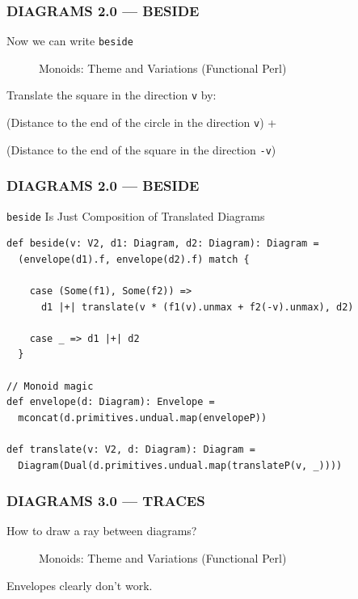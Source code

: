 \documentclass{beamer}
\begin{document}
\begin{frame} \frametitle{DIAGRAMS 2.0 --- BESIDE}
Now we can write \texttt{beside}
  \begin{figure}
      \centering
      \caption{Monoids: Theme and Variations (Functional Perl)}
  \end{figure}
  \vspace{-.5cm}
  Translate the square in the direction \texttt{v} by:

  (Distance to the end of the circle in the direction \texttt{v}) +

  (Distance to the end of the square in the direction \texttt{-v})
\end{frame}

\begin{frame}[fragile] \frametitle{DIAGRAMS 2.0 --- BESIDE}
  \begin{block}{\texttt{beside} Is Just Composition of Translated Diagrams}
  \begin{lstlisting}
def beside(v: V2, d1: Diagram, d2: Diagram): Diagram =
  (envelope(d1).f, envelope(d2).f) match {

    case (Some(f1), Some(f2)) =>
      d1 |+| translate(v * (f1(v).unmax + f2(-v).unmax), d2)

    case _ => d1 |+| d2
  }

// Monoid magic
def envelope(d: Diagram): Envelope =
  mconcat(d.primitives.undual.map(envelopeP))

def translate(v: V2, d: Diagram): Diagram =
  Diagram(Dual(d.primitives.undual.map(translateP(v, _))))
  \end{lstlisting}
  \vspace{-0.4cm}
  \end{block}
\end{frame}

\begin{frame} \frametitle{DIAGRAMS 3.0 --- TRACES}
How to draw a ray between diagrams?

  \begin{figure}
      \centering
      \caption{Monoids: Theme and Variations (Functional Perl)}
  \end{figure}

Envelopes clearly don't work.
\end{frame}
\end{document}
